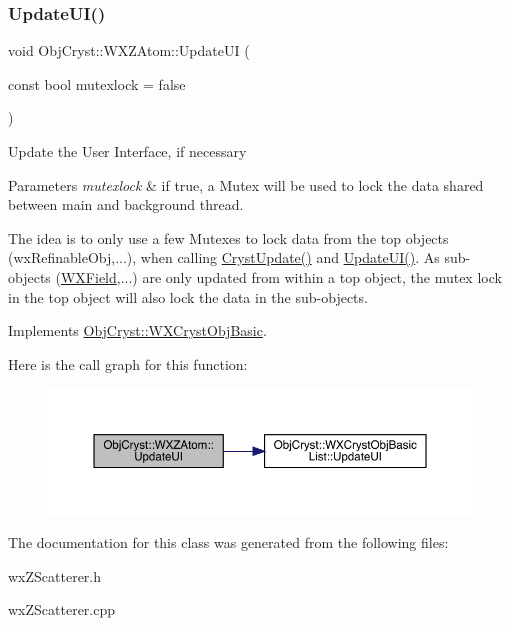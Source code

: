\subsubsection{\texorpdfstring{UpdateUI()}{UpdateUI()}}
{\footnotesize\ttfamily void Obj\+Cryst\+::\+W\+X\+Z\+Atom\+::\+Update\+UI (\begin{DoxyParamCaption}\item[{const bool}]{mutexlock = {\ttfamily false} }\end{DoxyParamCaption})\hspace{0.3cm}{\ttfamily [virtual]}}

Update the User Interface, if necessary


\begin{DoxyParams}{Parameters}
{\em mutexlock} & if true, a Mutex will be used to lock the data shared between main and background thread.\\
\hline
\end{DoxyParams}
The idea is to only use a few Mutexes to lock data from the top objects (wx\+Refinable\+Obj,...), when calling \mbox{\hyperlink{class_obj_cryst_1_1_w_x_z_atom_af5872f558b7828759bbcd07a3a5aa53b}{Cryst\+Update()}} and \mbox{\hyperlink{class_obj_cryst_1_1_w_x_z_atom_ad98ce4a82eb861cb2fafbddb7ab9bfbe}{Update\+U\+I()}}. As sub-\/objects (\mbox{\hyperlink{class_obj_cryst_1_1_w_x_field}{W\+X\+Field}},...) are only updated from within a top object, the mutex lock in the top object will also lock the data in the sub-\/objects. 

Implements \mbox{\hyperlink{class_obj_cryst_1_1_w_x_cryst_obj_basic_a3818940b7031ff7e45cf2178c4a99c90}{Obj\+Cryst\+::\+W\+X\+Cryst\+Obj\+Basic}}.

Here is the call graph for this function\+:
\nopagebreak
\begin{figure}[H]
\begin{center}
\leavevmode
\includegraphics[width=350pt]{class_obj_cryst_1_1_w_x_z_atom_ad98ce4a82eb861cb2fafbddb7ab9bfbe_cgraph}
\end{center}
\end{figure}


The documentation for this class was generated from the following files\+:\begin{DoxyCompactItemize}
\item 
wx\+Z\+Scatterer.\+h\item 
wx\+Z\+Scatterer.\+cpp\end{DoxyCompactItemize}
